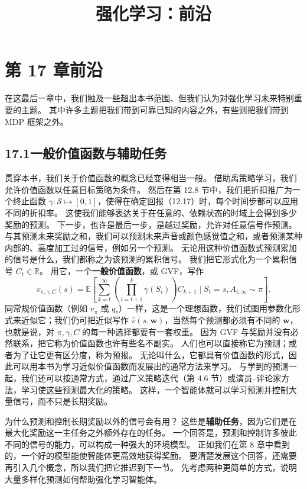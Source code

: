 \documentclass[UTF8,12pt,a4paper,fontset=fandol]{ctexart}
\title{强化学习：前沿}
\author{}
\date{}
\begin{document}
\maketitle

\section*{第 17 章\quad 前沿}

在这最后一章中，我们触及一些超出本书范围、但我们认为对强化学习未来特别重要的主题。
其中许多主题把我们带到可靠已知的内容之外，有些则把我们带到 MDP 框架之外。

\subsection*{17.1\quad 一般价值函数与辅助任务}

贯穿本书，我们关于价值函数的概念已经变得相当一般。
借助离策略学习，我们允许价值函数以任意目标策略为条件。
然后在第 12.8 节中，我们把折扣推广为一个终止函数 $\gamma:\mathcal{S}\mapsto[0,1]$，使得在确定回报（12.17）时，每个时间步都可以应用不同的折扣率。
这使我们能够表达关于在任意的、依赖状态的时域上会得到多少奖励的预测。
下一步，也许是最后一步，是越过奖励，允许对任意信号作预测。
与其预测未来奖励之和，我们可以预测未来声音或颜色感觉值之和，或者预测某种内部的、高度加工过的信号，例如另一个预测。
无论用这种价值函数式预测累加的信号是什么，我们都称之为该预测的累积信号。
我们把它形式化为一个累积信号 $C_t\in\mathbb{R}$。
用它，一个\textbf{一般价值函数}，或 GVF，写作
\begin{equation}
v_{\pi,\gamma,C}(s)=
\mathbb{E}\left[
\sum_{k=t}^{\infty}
\left(\prod_{i=t+1}^{k}\gamma(S_i)\right)C_{k+1}
\mid S_t=s,A_{t:\infty}\sim\pi
\right].
\tag{17.1}
\end{equation}
同常规价值函数（例如 $v_\pi$ 或 $q_*$）一样，这是一个理想函数，我们试图用参数化形式来近似它；我们仍可把近似写作 $\hat v(s,\mathbf{w})$，当然每个预测都必须有不同的 $\mathbf{w}$，也就是说，对 $\pi,\gamma,C$ 的每一种选择都要有一套权重。
因为 GVF 与奖励并没有必然联系，把它称为价值函数也许有些名不副实。
人们也可以直接称它为预测；或者为了让它更有区分度，称为预报。
无论叫什么，它都具有价值函数的形式，因此可以用本书为学习近似价值函数而发展出的通常方法来学习。
与学到的预测一起，我们还可以按通常方式，通过广义策略迭代（第 4.6 节）或演员--评论家方法，学习使这些预测最大化的策略。
这样，一个智能体就可以学习预测并控制大量信号，而不只是长期奖励。

为什么预测和控制长期奖励以外的信号会有用？
这些是\textbf{辅助任务}，因为它们是在最大化奖励这一主任务之外额外存在的任务。
一个回答是，预测和控制许多彼此不同的信号的能力，可以构成一种强大的环境模型。
正如我们在第 8 章中看到的，一个好的模型能使智能体更高效地获得奖励。
要清楚发展这个回答，还需要再引入几个概念，所以我们把它推迟到下一节。
先考虑两种更简单的方式，说明大量多样化预测如何帮助强化学习智能体。
\end{document}
